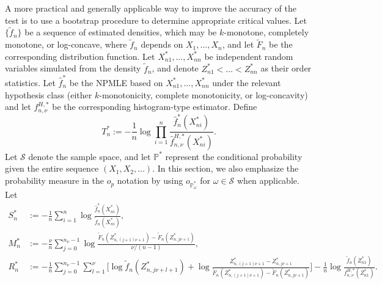 \documentclass[12pt,letterpaper, twoside, openany]{article}
\theoremstyle{plain}
\begin{document}
  A more practical and generally applicable way to improve the accuracy of the test is to use a bootstrap procedure to determine appropriate critical values. 
Let $\{\tilde{f}_n\}$ be a sequence of estimated densities, which may be $k$-monotone, completely monotone, or log-concave, where $\tilde{f}_n$ depends on $X_1,\ldots,X_n$, and let $\tilde{F}_{n}$ be the corresponding distribution function. Let $X_{n1}^*,\ldots,X_{nn}^*$ be independent random  variables simulated from the density $\tilde{f}_{n}$, and denote $Z_{n1}^* < \ldots < Z_{nn}^*$ as their order statistics. Let $\hat{f}^*_n$ be the NPMLE based on $X_{n1}^*,\ldots,X_{nn}^*$ under the relevant hypothesis class (either $k$-monotonicity, complete monotonicity, or log-concavity) and let $f_{n,\nu}^{H,*}$ be the corresponding histogram-type estimator.
		Define
		\begin{equation*}
	T_n^* := -\frac{1}{n}\log \prod_{i=1}^n  \frac{ \hat{f}_n^{*}(X_{ni}^{*})}{ \hat{f}_{n,\nu}^{H, *}(X_{ni}^{*})}.
		\end{equation*}
		Let $\mathcal{S}$ denote the sample space, and let $\mathbb{P}^*$ represent the conditional probability given 
		the entire sequence $(X_1,X_2,\ldots)$.
		In this section, we also emphasize the probability measure in the $o_p$ notation by using $o_{\mathbb{P}^*_\omega}$ for $\omega \in \mathcal{S}$ when applicable. Let
  \begin{align*}
S_n^* &:= - \frac{1}{n}\sum^n_{i=1} \log \frac{\hat{f}_n^*(X_{ni}^*)}{\tilde{f}_n(X_{ni}^*)},\\
%
M_n^* &:= -  \frac{\nu}{n} \sum_{j=0}^{n_{\nu} - 1} 
\log \frac{\tilde{F}_n(Z_{n,(j+1)\nu+1}^*) - \tilde{F}_n(Z_{n,j\nu+1}^*)}{\nu/(n-1)},\\
%
R_n^*&:=	- \frac{1}{n} \sum_{j=0}^{n_{\nu} - 1} 
\sum^\nu_{l=1} \bigg[ \log \tilde{f}_n(Z_{n,j\nu+l+1}^*) + \log \frac{Z_{n,(j+1)\nu+1}^* - Z_{n,j\nu+1}^*}{\tilde{F}_n(Z_{n,(j+1)\nu+1}^*) - \tilde{F}_n(Z_{n,j\nu+1}^*)} \bigg] -\frac{1}{n} \log \frac{\tilde{f}_n(Z_{n1}^*)}{f^{H,*}_{n,\nu}(Z_{n1}^*)}.
\end{align*}
		
		
\end{document}
